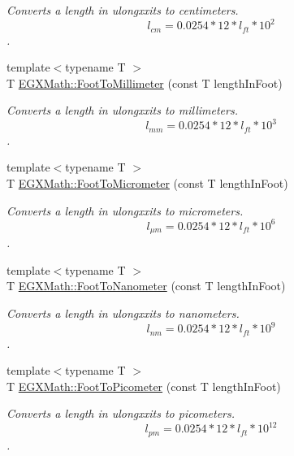 \begin{DoxyCompactItemize}
\begin{DoxyCompactList}\small\item\em Converts a length in ulongxxits to centimeters. \[ l_{cm}=0.0254 * 12 * l_{ft} * 10^{2} \]. \end{DoxyCompactList}\item 
{\footnotesize template$<$typename T $>$ }\\T \mbox{\hyperlink{group___e_g_x_math-_conversions-_length_conversions-_imperial-_foot-_s_i_ga51301d8a694ede90ead086b69ba7d392}{E\+G\+X\+Math\+::\+Foot\+To\+Millimeter}} (const T length\+In\+Foot)
\begin{DoxyCompactList}\small\item\em Converts a length in ulongxxits to millimeters. \[ l_{mm}=0.0254 * 12 * l_{ft} * 10^{3} \]. \end{DoxyCompactList}\item 
{\footnotesize template$<$typename T $>$ }\\T \mbox{\hyperlink{group___e_g_x_math-_conversions-_length_conversions-_imperial-_foot-_s_i_ga2cb67daa37af94d5ddd376a4deda1b0c}{E\+G\+X\+Math\+::\+Foot\+To\+Micrometer}} (const T length\+In\+Foot)
\begin{DoxyCompactList}\small\item\em Converts a length in ulongxxits to micrometers. \[ l_{\mu m}=0.0254 * 12 * l_{ft} * 10^{6} \]. \end{DoxyCompactList}\item 
{\footnotesize template$<$typename T $>$ }\\T \mbox{\hyperlink{group___e_g_x_math-_conversions-_length_conversions-_imperial-_foot-_s_i_ga617c8ccb63241606ac5eacdac69f78c5}{E\+G\+X\+Math\+::\+Foot\+To\+Nanometer}} (const T length\+In\+Foot)
\begin{DoxyCompactList}\small\item\em Converts a length in ulongxxits to nanometers. \[ l_{nm}=0.0254 * 12 * l_{ft} * 10^{9} \]. \end{DoxyCompactList}\item 
{\footnotesize template$<$typename T $>$ }\\T \mbox{\hyperlink{group___e_g_x_math-_conversions-_length_conversions-_imperial-_foot-_s_i_ga2d46da89e13218f0c8d75356c0d03942}{E\+G\+X\+Math\+::\+Foot\+To\+Picometer}} (const T length\+In\+Foot)
\begin{DoxyCompactList}\small\item\em Converts a length in ulongxxits to picometers. \[ l_{pm}=0.0254 * 12 * l_{ft} * 10^{12} \]. \end{DoxyCompactList}\item 

\end{DoxyCompactItemize}
